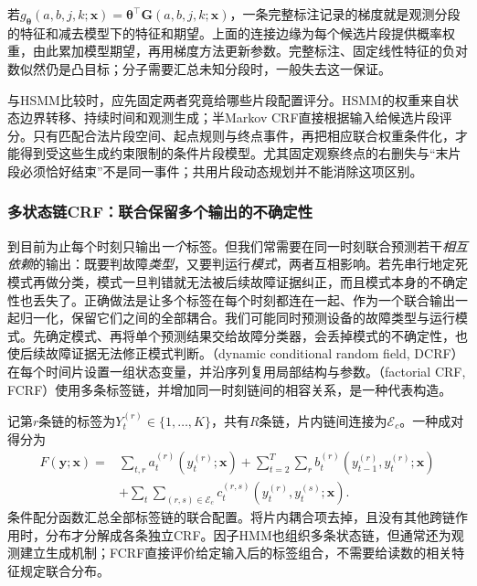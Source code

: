 若$g_{\bm\theta}(a,b,j,k;\bm x)=\bm\theta^\top\bm G(a,b,j,k;\bm x)$，一条完整标注记录的梯度就是观测分段的特征和减去模型下的特征和期望。上面的连接边缘为每个候选片段提供概率权重，由此累加模型期望，再用梯度方法更新参数。完整标注、固定线性特征的负对数似然仍是凸目标；分子需要汇总未知分段时，一般失去这一保证。

与HSMM比较时，应先固定两者究竟给哪些片段配置评分。HSMM的权重来自状态边界转移、持续时间和观测生成；半Markov CRF直接根据输入给候选片段评分。只有匹配合法片段空间、起点规则与终点事件，再把相应联合权重条件化，才能得到受这些生成约束限制的条件片段模型。尤其固定观察终点的右删失与“末片段必须恰好结束”不是同一事件；共用片段动态规划并不能消除这项区别。

\subsubsection{多状态链CRF：联合保留多个输出的不确定性}
\label{sec:pgm-dynamic-undirected-factorial-crf}

到目前为止每个时刻只输出\emph{一个}标签。但我们常需要在同一时刻联合预测若干\emph{相互依赖}的输出：既要判故障\emph{类型}，又要判运行\emph{模式}，两者互相影响。若先串行地定死模式再做分类，模式一旦判错就无法被后续故障证据纠正，而且模式本身的不确定性也丢失了。正确做法是让多个标签在每个时刻都连在一起、作为一个联合输出一起归一化，保留它们之间的全部耦合。我们可能同时预测设备的故障类型与运行模式。先确定模式、再将单个预测结果交给故障分类器，会丢掉模式的不确定性，也使后续故障证据无法修正模式判断。（dynamic conditional random field, DCRF）在每个时间片设置一组状态变量，并沿序列复用局部结构与参数。（factorial CRF, FCRF）使用多条标签链，并增加同一时刻链间的相容关系，是一种代表构造。

记第$r$条链的标签为$Y_t^{(r)}\in\{1,\ldots,K\}$，共有$R$条链，片内链间连接为$\mathcal E_c$。一种成对得分为
\begin{equation}
  \begin{aligned}
    F(\bm y;\bm x)={}&\sum_{t,r}a_t^{(r)}(y_t^{(r)};\bm x)
       +\sum_{t=2}^T\sum_r b_t^{(r)}
                (y_{t-1}^{(r)},y_t^{(r)};\bm x)\\
       &+\sum_t\sum_{(r,s)\in\mathcal E_c}
              c_t^{(r,s)}(y_t^{(r)},y_t^{(s)};\bm x).
  \end{aligned}
  \label{eq:pgm-dynamic-undirected-factorial-score}
\end{equation}
条件配分函数汇总全部标签链的联合配置。将片内耦合项去掉，且没有其他跨链作用时，分布才分解成各条独立CRF。因子HMM也组织多条状态链，但通常还为观测建立生成机制；FCRF直接评价给定输入后的标签组合，不需要给读数的相关特征规定联合分布。

